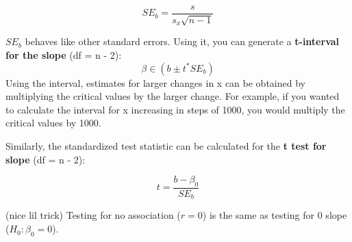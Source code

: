 \documentclass[12pt, a4paper]{article}
\theoremstyle{definition}
\begin{document}
\[SE_b = \frac{s}{s_x \sqrt{n - 1}}\]

$SE_b$ behaves like other standard errors.
Using it, you can generate a \textbf{t-interval for the slope} (df = n - 2):
\[\beta \in (b \pm t^{*}SE_b)\]
Using the interval, estimates for larger changes in x can be obtained by multiplying the critical values by the larger change.
For example, if you wanted to calculate the interval for x increasing in steps of 1000, you would multiply the critical values by 1000.

Similarly, the standardized test statistic can be calculated for the \textbf{t test for slope} (df = n - 2):

\[t = \frac{b - \beta_0}{SE_b}\]

(nice lil trick) Testing for no association ($r = 0$) is the same as testing for 0 slope ($H_0: \beta_0 = 0$). 
\end{document}
